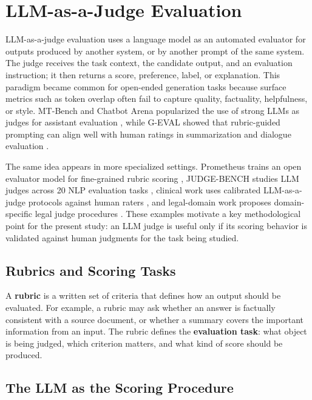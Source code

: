\documentclass[12pt,a4paper,twoside,openright]{book}
\begin{document}
\section{LLM-as-a-Judge Evaluation}

LLM-as-a-judge evaluation uses a language model as an automated evaluator for
outputs produced by another system, or by another prompt of the same system. The
judge receives the task context, the candidate output, and an evaluation
instruction; it then returns a score, preference, label, or explanation. This
paradigm became common for open-ended generation tasks because surface metrics
such as token overlap often fail to capture quality, factuality, helpfulness, or
style. MT-Bench and Chatbot Arena popularized the use of strong LLMs as judges
for assistant evaluation \cite{DBLP:journals/corr/abs-2306-05685}, while
G-EVAL showed that rubric-guided prompting can align well with human ratings in
summarization and dialogue evaluation \cite{DBLP:conf/emnlp/LiuIXWXZ23}.

The same idea appears in more specialized settings. Prometheus trains an open
evaluator model for fine-grained rubric scoring
\cite{DBLP:journals/corr/abs-2310-08491}, JUDGE-BENCH studies LLM judges across
20 NLP evaluation tasks \cite{DBLP:journals/corr/abs-2406-18403}, clinical work
uses calibrated LLM-as-a-judge protocols against human raters
\cite{DBLP:journals/corr/abs-2605-16215}, and legal-domain work proposes
domain-specific legal judge procedures \cite{DBLP:journals/corr/abs-2510-07243}.
These examples motivate a key methodological point for the present study: an LLM
judge is useful only if its scoring behavior is validated against human
judgments for the task being studied.

\subsection{Rubrics and Scoring Tasks}

A \textbf{rubric} is a written set of criteria that defines how an output should
be evaluated. For example, a rubric may ask whether an answer is factually
consistent with a source document, or whether a summary covers the important
information from an input. The rubric defines the \textbf{evaluation task}: what
object is being judged, which criterion matters, and what kind of score should
be produced.

\subsection{The LLM as the Scoring Procedure}
\end{document}
